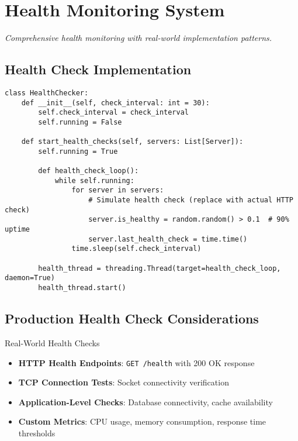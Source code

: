 \documentclass[12pt,a4paper]{article}
\begin{document}
\section{Health Monitoring System}
\label{sec:health}

\textit{Comprehensive health monitoring with real-world implementation patterns.}

\subsection{Health Check Implementation}
\label{subsec:healthimpl}

\begin{lstlisting}[caption=Health Monitoring System]
class HealthChecker:
    def __init__(self, check_interval: int = 30):
        self.check_interval = check_interval
        self.running = False
        
    def start_health_checks(self, servers: List[Server]):
        self.running = True
        
        def health_check_loop():
            while self.running:
                for server in servers:
                    # Simulate health check (replace with actual HTTP check)
                    server.is_healthy = random.random() > 0.1  # 90% uptime
                    server.last_health_check = time.time()
                time.sleep(self.check_interval)
        
        health_thread = threading.Thread(target=health_check_loop, daemon=True)
        health_thread.start()
\end{lstlisting}

\subsection{Production Health Check Considerations}

\begin{infobox}{Real-World Health Checks}
\begin{itemize}
    \item \textbf{HTTP Health Endpoints}: \texttt{GET /health} with 200 OK response
    \item \textbf{TCP Connection Tests}: Socket connectivity verification
    \item \textbf{Application-Level Checks}: Database connectivity, cache availability
    \item \textbf{Custom Metrics}: CPU usage, memory consumption, response time thresholds
\end{itemize}
\end{infobox}
\end{document}
